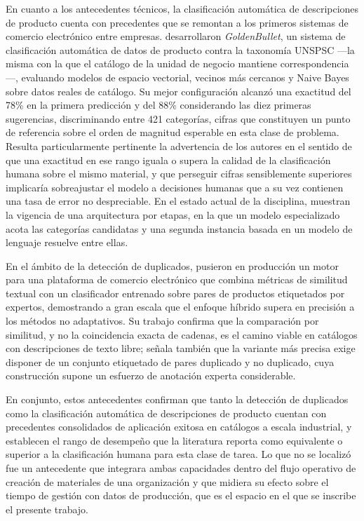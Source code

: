 En cuanto a los antecedentes técnicos, la clasificación automática de descripciones de producto cuenta con precedentes que se remontan a los primeros sistemas de comercio electrónico entre empresas.  desarrollaron \textit{GoldenBullet}, un sistema de clasificación automática de datos de producto contra la taxonomía UNSPSC —la misma con la que el catálogo de la unidad de negocio mantiene correspondencia—, evaluando modelos de espacio vectorial, vecinos más cercanos y Naive Bayes sobre datos reales de catálogo. Su mejor configuración alcanzó una exactitud del 78\% en la primera predicción y del 88\% considerando las diez primeras sugerencias, discriminando entre 421 categorías, cifras que constituyen un punto de referencia sobre el orden de magnitud esperable en esta clase de problema. Resulta particularmente pertinente la advertencia de los autores en el sentido de que una exactitud en ese rango iguala o supera la calidad de la clasificación humana sobre el mismo material, y que perseguir cifras sensiblemente superiores implicaría sobreajustar el modelo a decisiones humanas que a su vez contienen una tasa de error no despreciable. En el estado actual de la disciplina,  muestran la vigencia de una arquitectura por etapas, en la que un modelo especializado acota las categorías candidatas y una segunda instancia basada en un modelo de lenguaje resuelve entre ellas.

En el ámbito de la detección de duplicados,  pusieron en producción un motor para una plataforma de comercio electrónico que combina métricas de similitud textual con un clasificador entrenado sobre pares de productos etiquetados por expertos, demostrando a gran escala que el enfoque híbrido supera en precisión a los métodos no adaptativos. Su trabajo confirma que la comparación por similitud, y no la coincidencia exacta de cadenas, es el camino viable en catálogos con descripciones de texto libre; señala también que la variante más precisa exige disponer de un conjunto etiquetado de pares duplicado y no duplicado, cuya construcción supone un esfuerzo de anotación experta considerable.

En conjunto, estos antecedentes confirman que tanto la detección de duplicados como la clasificación automática de descripciones de producto cuentan con precedentes consolidados de aplicación exitosa en catálogos a escala industrial, y establecen el rango de desempeño que la literatura reporta como equivalente o superior a la clasificación humana para esta clase de tarea. Lo que no se localizó fue un antecedente que integrara ambas capacidades dentro del flujo operativo de creación de materiales de una organización y que midiera su efecto sobre el tiempo de gestión con datos de producción, que es el espacio en el que se inscribe el presente trabajo.
